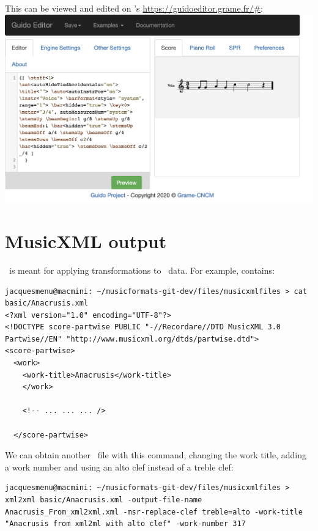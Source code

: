 This can be viewed and edited on \fober 's \url{https://guidoeditor.grame.fr/#}:\\
\includegraphics[scale=0.7]{../graphics/Anacrusis_Guido.png}


\section{MusicXML output}

\xmlToXml\ is meant for applying transformations to \mxml\ data. For example,  contains:
\begin{lstlisting}[language=Terminal]
jacquesmenu@macmini: ~/musicformats-git-dev/files/musicxmlfiles > cat basic/Anacrusis.xml
<?xml version="1.0" encoding="UTF-8"?>
<!DOCTYPE score-partwise PUBLIC "-//Recordare//DTD MusicXML 3.0 Partwise//EN" "http://www.musicxml.org/dtds/partwise.dtd">
<score-partwise>
  <work>
    <work-title>Anacrusis</work-title>
    </work>

	<!-- ... ... ... />
	
  </score-partwise>
\end{lstlisting}

We can obtain another \mxml\ file with this command, changing the work title, adding a work number and using an alto clef instead of a treble clef:
\begin{lstlisting}[language=Terminal]
jacquesmenu@macmini: ~/musicformats-git-dev/files/musicxmlfiles > xml2xml basic/Anacrusis.xml -output-file-name Anacrusis_From_xml2xml.xml -msr-replace-clef treble=alto -work-title "Anacrusis from xml2ml with alto clef" -work-number 317
\end{lstlisting}

